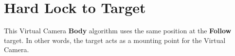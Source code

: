 \chapter{Hard Lock to Target}
\hypertarget{md__hey_tea_9_2_library_2_package_cache_2com_8unity_8cinemachine_0d2_89_87_2_documentation_0i_2_3d7f67ebf07ab57ce9d12e976cf16138}{}\label{md__hey_tea_9_2_library_2_package_cache_2com_8unity_8cinemachine_0d2_89_87_2_documentation_0i_2_3d7f67ebf07ab57ce9d12e976cf16138}
\label{md__hey_tea_9_2_library_2_package_cache_2com_8unity_8cinemachine_0d2_89_87_2_documentation_0i_2_3d7f67ebf07ab57ce9d12e976cf16138_autotoc_md653}%
%
 This Virtual Camera {\bfseries{Body}} algorithm uses the same position at the {\bfseries{Follow}} target. In other words, the target acts as a mounting point for the Virtual Camera. 